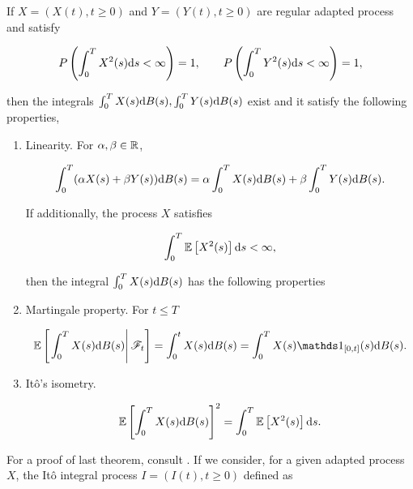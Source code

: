 \begin{theorem}
    If $X = (X(t), t \ge 0)$ and $Y = (Y(t), t \ge 0)$ are regular adapted process and satisfy

    \begin{equation*}
        P\left(  \int_0^T X^2(s) \mathrm d s < \infty  \right) = 1, \qquad P\left(  \int_0^T Y^2(s) \mathrm d s < \infty  \right) = 1,
    \end{equation*}

    \noindent then the integrals $\int_0^T X(s) \mathrm d B(s), \int_0^T Y(s) \mathrm d B(s)$ exist and it satisfy the following properties,

    \begin{enumerate}
        \item Linearity. For $\alpha,\beta \in \mathbb R$,

        \begin{equation}
            \int_0^T (\alpha X(s) + \beta Y(s))\mathrm d B(s) = \alpha \int_0^T X(s)\mathrm d B(s) + \beta \int_0^T Y(s) \mathrm d B(s).
        \end{equation}
    
    If additionally, the process $X$ satisfies 

    \begin{equation*}
        \int_0^T \mathbb E \left[ X^2(s) \right] \mathrm d s < \infty,
    \end{equation*}

    then the integral $\int_0^T X(s) \mathrm d B(s)$ has the following properties

    \item Martingale property. For $t \le T$
    
    \begin{equation*}
        \E{ \left. \int_0^T X(s) \d B(s) \right| \F_t  } = \int_0^t X(s) \d B(s) = \int_0^T X(s)\mathds 1_{[0,t]}(s) \d B(s).
    \end{equation*}

    \item Itô's isometry. 
    
    \begin{equation*}
        \mathbb E \left[  \int_0^T X(s) \mathrm d B(s)  \right]^2 = \int_0^T \mathbb E \left[ X^2(s) \right] \mathrm d s.
    \end{equation*}
    
    \end{enumerate}
\end{theorem}

For a proof of last theorem, consult \cite{book:klebaner}. If we consider, for a given adapted process $X$, the Itô integral process $I=(I(t), t \ge 0)$ defined as

